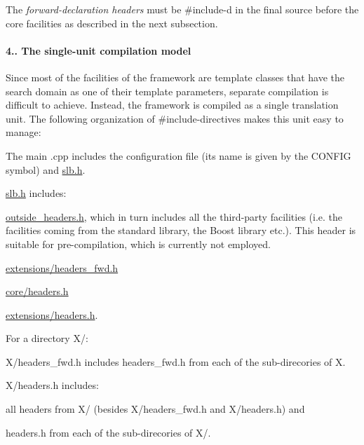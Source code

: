 The {\itshape forward-\/declaration headers} must be {\ttfamily \#include}-\/d in the final source before the core facilities as described in the next subsection.\hypertarget{index_s-single-unit}{}\paragraph{4.. The single-\/unit compilation model}\label{index_s-single-unit}
Since most of the facilities of the framework are template classes that have the search domain as one of their template parameters, separate compilation is difficult to achieve. Instead, the framework is compiled as a single translation unit. The following organization of {\ttfamily \#include}-\/directives makes this unit easy to manage\+:
\begin{DoxyItemize}
\item The main {\ttfamily .cpp} includes the configuration file (its name is given by the {\ttfamily C\+O\+N\+F\+IG} symbol) and {\ttfamily \hyperlink{slb_8h}{slb.\+h}}.
\item {\ttfamily \hyperlink{slb_8h}{slb.\+h}} includes\+:
\begin{DoxyItemize}
\item {\ttfamily \hyperlink{outside__headers_8h}{outside\+\_\+headers.\+h}}, which in turn includes all the third-\/party facilities (i.\+e. the facilities coming from the standard library, the {\ttfamily Boost} library etc.). This header is suitable for pre-\/compilation, which is currently not employed.
\item {\ttfamily \hyperlink{headers__fwd_8h}{extensions/headers\+\_\+fwd.\+h}}
\item {\ttfamily \hyperlink{core_2headers_8h}{core/headers.\+h}}
\item {\ttfamily \hyperlink{extensions_2headers_8h}{extensions/headers.\+h}}.
\end{DoxyItemize}
\item For a directory {\ttfamily X/}\+:
\begin{DoxyItemize}
\item {\ttfamily X/headers\+\_\+fwd.\+h} includes {\ttfamily headers\+\_\+fwd.\+h} from each of the sub-\/direcories of {\ttfamily X}.
\item {\ttfamily X/headers.\+h} includes\+:
\begin{DoxyItemize}
\item all headers from {\ttfamily X/} (besides {\ttfamily X/headers\+\_\+fwd.\+h} and {\ttfamily X/headers.\+h}) and
\item {\ttfamily headers.\+h} from each of the sub-\/direcories of {\ttfamily X/}.
\end{DoxyItemize}
\end{DoxyItemize}
\end{DoxyItemize}

